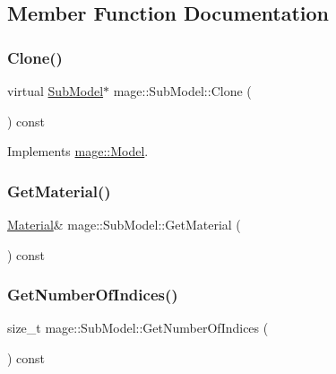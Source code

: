\subsection{Member Function Documentation}
\hypertarget{classmage_1_1_sub_model_a368bcc2ee819cc29ec0203e314ae91d3}{}\label{classmage_1_1_sub_model_a368bcc2ee819cc29ec0203e314ae91d3} 
\subsubsection{\texorpdfstring{Clone()}{Clone()}}
{\footnotesize\ttfamily virtual \hyperlink{classmage_1_1_sub_model}{Sub\+Model}$\ast$ mage\+::\+Sub\+Model\+::\+Clone (\begin{DoxyParamCaption}{ }\end{DoxyParamCaption}) const\hspace{0.3cm}{\ttfamily [virtual]}}



Implements \hyperlink{classmage_1_1_model_ae5e9bee52da0db8c7a29920c13ed40ea}{mage\+::\+Model}.

\hypertarget{classmage_1_1_sub_model_af993f41f73a72df9fca154083c5f7410}{}\label{classmage_1_1_sub_model_af993f41f73a72df9fca154083c5f7410} 
\subsubsection{\texorpdfstring{Get\+Material()}{GetMaterial()}}
{\footnotesize\ttfamily \hyperlink{structmage_1_1_material}{Material}\& mage\+::\+Sub\+Model\+::\+Get\+Material (\begin{DoxyParamCaption}{ }\end{DoxyParamCaption}) const}

\hypertarget{classmage_1_1_sub_model_a18736678fc1a5d882776298053e037b3}{}\label{classmage_1_1_sub_model_a18736678fc1a5d882776298053e037b3} 
\subsubsection{\texorpdfstring{Get\+Number\+Of\+Indices()}{GetNumberOfIndices()}}
{\footnotesize\ttfamily size\+\_\+t mage\+::\+Sub\+Model\+::\+Get\+Number\+Of\+Indices (\begin{DoxyParamCaption}{ }\end{DoxyParamCaption}) const}

